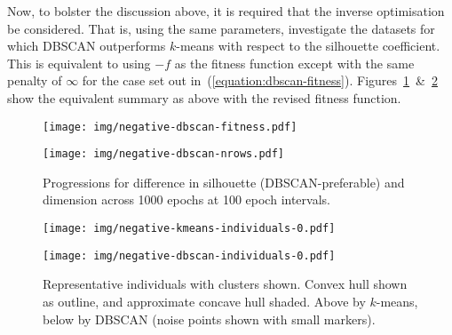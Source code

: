 
Now, to bolster the discussion above, it is required that the inverse
optimisation be considered. That is, using the same parameters, investigate the
datasets for which DBSCAN outperforms \(k\)-means with respect to the silhouette
coefficient. This is equivalent to using \(-f\) as the fitness function except
with the same penalty of \(\infty\) for the case set out
in~(\ref{equation:dbscan-fitness}).
Figures~\ref{figure:negative-dbscan}~\&~\ref{figure:negative-dbscan-individuals}
show the equivalent summary as above with the revised fitness function.

\begin{figure}[htbp]
    \centering
    \begin{minipage}{\imgwidth}
        \centering
        \texttt{[image: img/negative-dbscan-fitness.pdf]}
    \end{minipage}

    \begin{minipage}{\imgwidth}
        \centering
        \texttt{[image: img/negative-dbscan-nrows.pdf]}
    \end{minipage}
    \caption{Progressions for difference in silhouette (DBSCAN-preferable) and
             dimension across 1000 epochs at 100 epoch
             intervals.}\label{figure:negative-dbscan}
\end{figure}

\begin{figure}[htbp]
    \centering
    \texttt{[image: img/negative-kmeans-individuals-0.pdf]}

    \texttt{[image: img/negative-dbscan-individuals-0.pdf]}
    \caption{Representative individuals with clusters shown. Convex hull shown
             as outline, and approximate concave hull shaded. Above by
             \(k\)-means, below by DBSCAN (noise points shown with small
             markers).}\label{figure:negative-dbscan-individuals}
\end{figure}
